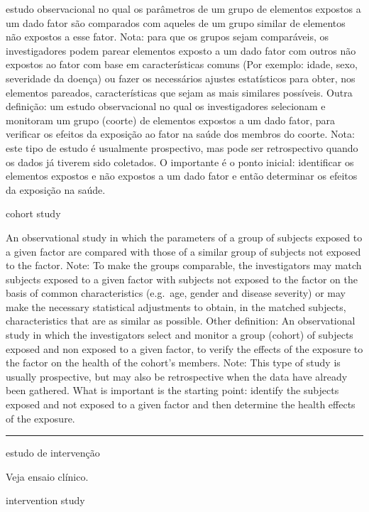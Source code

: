 \documentclass[
  openany]{book}
\begin{document}
estudo observacional no qual os parâmetros de um grupo de elementos expostos a um dado fator são comparados com aqueles de um grupo similar de elementos não expostos a esse fator. Nota: para que os grupos sejam comparáveis, os investigadores podem parear elementos exposto a um dado fator com outros não expostos ao fator com base em características comuns (Por exemplo: idade, sexo, severidade da doença) ou fazer os necessários ajustes estatísticos para obter, nos elementos pareados, características que sejam as mais similares possíveis. Outra definição: um estudo observacional no qual os investigadores selecionam e monitoram um grupo (coorte) de elementos expostos a um dado fator, para verificar os efeitos da exposição ao fator na saúde dos membros do coorte. Nota: este tipo de estudo é usualmente prospectivo, mas pode ser retrospectivo quando os dados já tiverem sido coletados. O importante é o ponto inicial: identificar os elementos expostos e não expostos a um dado fator e então determinar os efeitos da exposição na saúde.

cohort study

An observational study in which the parameters of a group of subjects exposed to a given factor are compared with those of a similar group of subjects not exposed to the factor. Note: To make the groups comparable, the investigators may match subjects exposed to a given factor with subjects not exposed to the factor on the basis of common characteristics (e.g.~age, gender and disease severity) or may make the necessary statistical adjustments to obtain, in the matched subjects, characteristics that are as similar as possible. Other definition: An observational study in which the investigators select and monitor a group (cohort) of subjects exposed and non exposed to a given factor, to verify the effects of the exposure to the factor on the health of the cohort's members. Note: This type of study is usually prospective, but may also be retrospective when the data have already been gathered. What is important is the starting point: identify the subjects exposed and not exposed to a given factor and then determine the health effects of the exposure.

\begin{center}\rule{0.5\linewidth}{0.5pt}\end{center}

estudo de intervenção

Veja ensaio clínico.

intervention study
\end{document}
